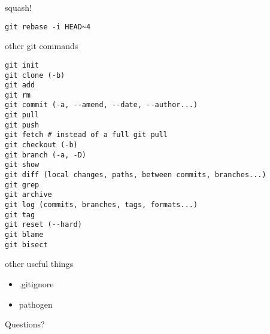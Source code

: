 \documentclass[landscape]{slides}
\begin{document}
\begin{slide}
squash!

\begin{verbatim}
git rebase -i HEAD~4
\end{verbatim}
\end{slide}

\begin{slide}
other git commands
\begin{verbatim}
git init
git clone (-b)
git add
git rm
git commit (-a, --amend, --date, --author...)
git pull
git push
git fetch # instead of a full git pull
git checkout (-b)
git branch (-a, -D)
git show
git diff (local changes, paths, between commits, branches...)
git grep
git archive
git log (commits, branches, tags, formats...)
git tag
git reset (--hard)
git blame
git bisect
\end{verbatim}
\end{slide}

\begin{slide}
other useful things

\begin{itemize}
\item{} .gitignore
\item{} pathogen
\end{itemize}
\end{slide}

\begin{slide}
\begin{center}
\begin{Huge}
Questions?
\end{Huge}
\end{center}
\end{slide}
\end{document}
